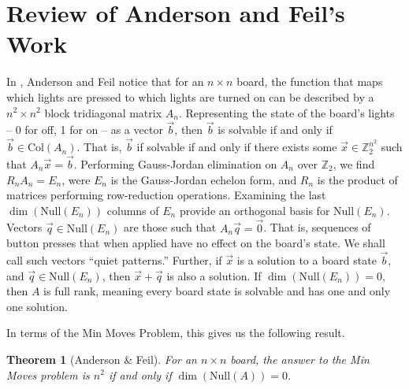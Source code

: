 \documentclass[a4paper]{article}
\newtheorem{theorem}{Theorem}
\newcommand{\Z}{\mathbb{Z}}
\begin{document}
	\section{Review of Anderson and Feil's Work}
	In \cite{anderson_feil}, Anderson and Feil notice that for an $n \times n$ board, the function that maps which lights are pressed to which lights are turned on can be described by a $n^2 \times n^2$ block tridiagonal matrix $A_n$.
	Representing the state of the board's lights -- 0 for off, 1 for on -- as a vector $\vec{b}$, then $\vec{b}$ is solvable if and only if $\vec{b} \in \text{Col}(A_n)$.
	That is, $\vec{b}$ if solvable if and only if there exists some $\vec{x} \in \Z^{n^2}_2$ such that $A_n\vec{x} = \vec{b}$.
	Performing Gauss-Jordan elimination on $A_n$ over $\Z_2$, we find $R_nA_n = E_n$, were $E_n$ is the Gauss-Jordan echelon form, and $R_n$ is the product of matrices performing row-reduction operations.
	Examining the last $\dim(\text{Null}(E_n))$ columns of $E_n$ provide an orthogonal basis for $\text{Null}(E_n)$.
	Vectors $\vec{q} \in \text{Null}(E_n)$ are those such that $A_n\vec{q} = \vec{0}$.
	That is, sequences of button presses that when applied have no effect on the board's state.
	We shall call such vectors ``quiet patterns.''
	Further, if $\vec{x}$ is a solution to a board state $\vec{b}$, and $\vec{q} \in \text{Null}(E_n)$, then $\vec{x} + \vec{q}$ is also a solution.
	If $\dim(\text{Null}(E_n)) = 0$, then $A$ is full rank, meaning every board state is solvable and has one and only one solution.
	
	In terms of the Min Moves Problem, this gives us the following result.
	\begin{theorem}[Anderson \& Feil]\label{ansderson-feil-trivial-n2}
		For an $n \times n$ board, the answer to the Min Moves problem is $n^2$ if and only if $\dim(\text{Null}(A)) = 0$.
	\end{theorem}
		
\end{document}
